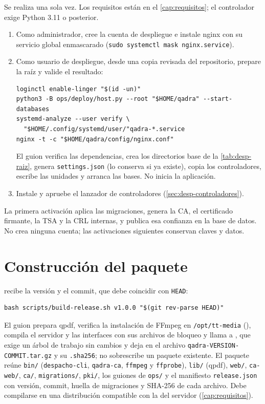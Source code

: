 Se realiza una sola vez. Los requisitos están en el \cref{cap:requisitos};
el controlador exige Python 3.11 o posterior.

\begin{enumerate}
  \item Como administrador, cree la cuenta de despliegue e instale nginx
    con su servicio global enmascarado
    (\texttt{sudo systemctl mask nginx.service}).
  \item Como usuario de despliegue, desde una copia revisada del
    repositorio, prepare la raíz y valide el resultado:
\begin{verbatim}
loginctl enable-linger "$(id -un)"
python3 -B ops/deploy/host.py --root "$HOME/qadra" --start-databases
systemd-analyze --user verify \
  "$HOME/.config/systemd/user/"qadra-*.service
nginx -t -c "$HOME/qadra/config/nginx.conf"
\end{verbatim}
    El guion verifica las dependencias, crea los directorios base de la
    \cref{tab:desp-raiz}, genera \texttt{settings.json} (lo conserva si ya
    existe), copia los controladores, escribe las unidades y arranca las
    bases. No inicia la aplicación.
  \item Instale y apruebe el lanzador de controladores
    (\cref{sec:desp-controladores}).
\end{enumerate}

La primera activación aplica las migraciones, genera la CA, el certificado
firmante, la TSA y la CRL internas, y publica esa confianza en la base de
datos. No crea ninguna cuenta; las activaciones siguientes conservan claves
y datos.

\section{Construcción del paquete}\label{sec:desp-paquete}

 recibe la versión y el commit, que debe
coincidir con \texttt{HEAD}:

\begin{verbatim}
bash scripts/build-release.sh v1.0.0 "$(git rev-parse HEAD)"
\end{verbatim}

El guion prepara qpdf, verifica la instalación de FFmpeg en
\texttt{/opt/tt-media} (), compila
el servidor y las interfaces con sus archivos de bloqueo y llama a
\archivo{ops/deploy/bundle.py}, que exige un árbol de trabajo sin cambios y
deja en \archivo{output/releases/} el archivo
\texttt{qadra-VERSION-COMMIT.tar.gz} y su \texttt{.sha256}; no sobrescribe
un paquete existente. El paquete reúne \texttt{bin/}
(\texttt{despacho-cli}, \texttt{qadra-ca}, \texttt{ffmpeg} y
\texttt{ffprobe}), \texttt{lib/} (qpdf), \texttt{web/}, \texttt{ca-web/},
\texttt{ca/}, \texttt{migrations/}, \texttt{pki/}, los guiones de
\texttt{ops/} y el manifiesto \texttt{release.json} con versión, commit,
huella de migraciones y SHA-256 de cada archivo. Debe compilarse en una
distribución compatible con la del servidor (\cref{cap:requisitos}).


